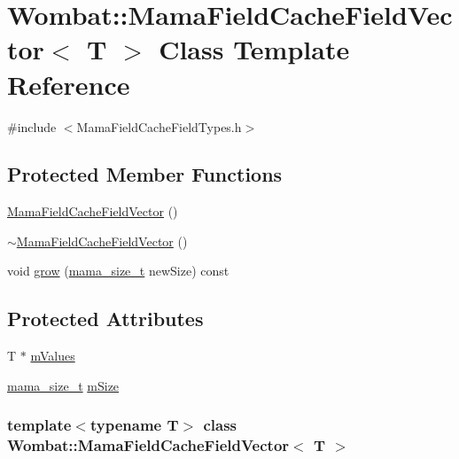 \hypertarget{classWombat_1_1MamaFieldCacheFieldVector}{
\section{Wombat::MamaFieldCacheFieldVector$<$ T $>$ Class Template Reference}
\label{classWombat_1_1MamaFieldCacheFieldVector}
}


{\ttfamily \#include $<$MamaFieldCacheFieldTypes.h$>$}\subsection*{Protected Member Functions}
\begin{DoxyCompactItemize}
\item 
\hyperlink{classWombat_1_1MamaFieldCacheFieldVector_a2078738f000e28ec40f2e8390df3f8a0}{MamaFieldCacheFieldVector} ()
\item 
\hyperlink{classWombat_1_1MamaFieldCacheFieldVector_a74140cb13097ad032a0bb43d088421a2}{$\sim$MamaFieldCacheFieldVector} ()
\item 
void \hyperlink{classWombat_1_1MamaFieldCacheFieldVector_a78c5f414cc9913b2dd0ad4ecfdca9310}{grow} (\hyperlink{classmama__size__t}{mama\_\-size\_\-t} newSize) const 
\end{DoxyCompactItemize}
\subsection*{Protected Attributes}
\begin{DoxyCompactItemize}
\item 
T $\ast$ \hyperlink{classWombat_1_1MamaFieldCacheFieldVector_ae5c35c231520f4788f44a61789073e71}{mValues}
\item 
\hyperlink{classmama__size__t}{mama\_\-size\_\-t} \hyperlink{classWombat_1_1MamaFieldCacheFieldVector_a3fb3546a3ea30e06e9bb0a7afa00e06a}{mSize}
\end{DoxyCompactItemize}
\subsubsection*{template$<$typename T$>$ class Wombat::MamaFieldCacheFieldVector$<$ T $>$}



